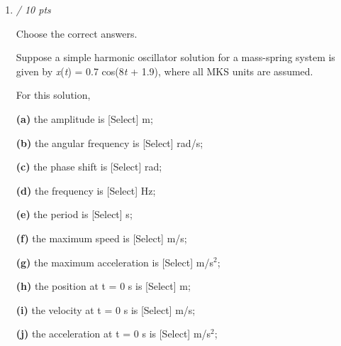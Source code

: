\documentclass[11pt]{article}
\begin{document}
\begin{enumerate}[leftmargin=*,label=\textbf{Question \arabic*.}]
\textit{Answer 1:}
\begin{itemize}
  \item \textbf{[correct]} 4.00
\end{itemize}
\textit{Answer 2:}
\begin{itemize}
  \item \textbf{[correct]} 2.00
\end{itemize}
\textit{Answer 3:}
\begin{itemize}
  \item \textbf{[correct]} -0.500
  \item \textbf{[correct]} -.500
\end{itemize}
\textit{Answer 4:}
\begin{itemize}
  \item \textbf{[correct]} 0.318
  \item \textbf{[correct]} .318
\end{itemize}
\textit{Answer 5:}
\begin{itemize}
  \item \textbf{[correct]} 3.14
\end{itemize}

\item \hfill \textit{/ 10 pts}

Choose the correct answers.



Suppose a simple harmonic oscillator solution for a mass-spring system is given by \emph{x}(\emph{t}) = 0.7 cos(8\emph{t} + 1.9), where all MKS units are assumed.



For this solution,

\textbf{(a) }the amplitude is [Select]
 m;

\textbf{(b)} the angular frequency is [Select]
 rad/s;

\textbf{(c) }the phase shift is [Select]
 rad;

\textbf{(d)} the frequency is [Select]
 Hz;

\textbf{(e)} the period is [Select]
 s;

\textbf{(f)} the maximum speed is [Select]
 m/s;

\textbf{(g)} the maximum acceleration is [Select]
 m/s$^{2}$;

\textbf{(h)} the position at t = 0 s is [Select]
 m;

\textbf{(i)} the velocity at t = 0 s is [Select]
 m/s;

\textbf{(j)} the acceleration at t = 0 s is [Select]
 m/s$^{2}$;


\end{enumerate}
\end{document}

